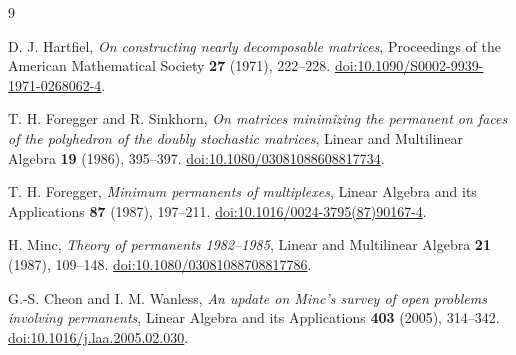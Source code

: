 \documentclass[11pt]{article}
\theoremstyle{definition}
\begin{document}
\begin{thebibliography}{9}

D. J. Hartfiel,
\emph{On constructing nearly decomposable matrices},
Proceedings of the American Mathematical Society \textbf{27} (1971), 222--228.
\href{https://doi.org/10.1090/S0002-9939-1971-0268062-4}
{doi:10.1090/S0002-9939-1971-0268062-4}.

T. H. Foregger and R. Sinkhorn,
\emph{On matrices minimizing the permanent on faces of the polyhedron of the
doubly stochastic matrices},
Linear and Multilinear Algebra \textbf{19} (1986), 395--397.
\href{https://doi.org/10.1080/03081088608817734}
{doi:10.1080/03081088608817734}.

T. H. Foregger,
\emph{Minimum permanents of multiplexes},
Linear Algebra and its Applications \textbf{87} (1987), 197--211.
\href{https://doi.org/10.1016/0024-3795(87)90167-4}
{doi:10.1016/0024-3795(87)90167-4}.

H. Minc,
\emph{Theory of permanents 1982--1985},
Linear and Multilinear Algebra \textbf{21} (1987), 109--148.
\href{https://doi.org/10.1080/03081088708817786}
{doi:10.1080/03081088708817786}.

G.-S. Cheon and I. M. Wanless,
\emph{An update on Minc's survey of open problems involving permanents},
Linear Algebra and its Applications \textbf{403} (2005), 314--342.
\href{https://doi.org/10.1016/j.laa.2005.02.030}
{doi:10.1016/j.laa.2005.02.030}.

\end{thebibliography}
\end{document}

